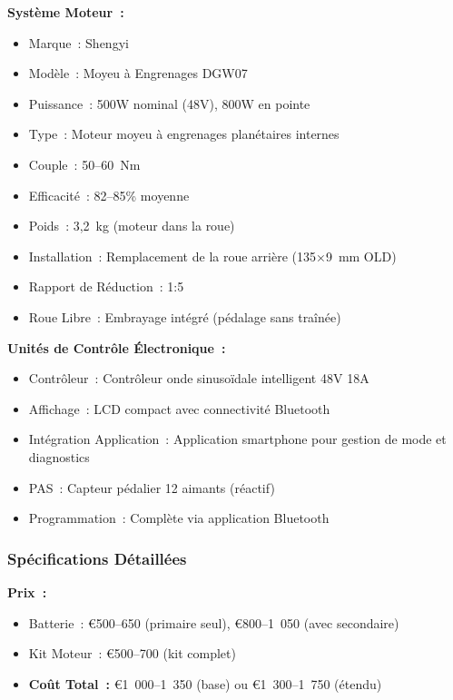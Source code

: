 \documentclass[12pt,a4paper]{article}
\begin{document}
\textbf{Système Moteur~:}
\begin{itemize}
    \item Marque~: Shengyi
    \item Modèle~: Moyeu à Engrenages DGW07 \cite{shengyi-dgw07}
    \item Puissance~: 500W nominal (48V), 800W en pointe
    \item Type~: Moteur moyeu à engrenages planétaires internes
    \item Couple~: 50--60~Nm
    \item Efficacité~: 82--85\% moyenne
    \item Poids~: 3,2~kg (moteur dans la roue)
    \item Installation~: Remplacement de la roue arrière (135×9~mm OLD)
    \item Rapport de Réduction~: 1:5
    \item Roue Libre~: Embrayage intégré (pédalage sans traînée)
\end{itemize}

\textbf{Unités de Contrôle Électronique~:}
\begin{itemize}
    \item Contrôleur~: Contrôleur onde sinusoïdale intelligent 48V 18A
    \item Affichage~: LCD compact avec connectivité Bluetooth
    \item Intégration Application~: Application smartphone pour gestion de mode et diagnostics
    \item PAS~: Capteur pédalier 12 aimants (réactif)
    \item Programmation~: Complète via application Bluetooth
\end{itemize}

\subsubsection{Spécifications Détaillées}

\textbf{Prix~:}
\begin{itemize}
    \item Batterie~: €500--650 (primaire seul), €800--1~050 (avec secondaire) \cite{aliexpress-batteries}
    \item Kit Moteur~: €500--700 (kit complet) \cite{aliexpress-batteries}
    \item \textbf{Coût Total~:} €1~000--1~350 (base) ou €1~300--1~750 (étendu)
\end{itemize}
\end{document}
